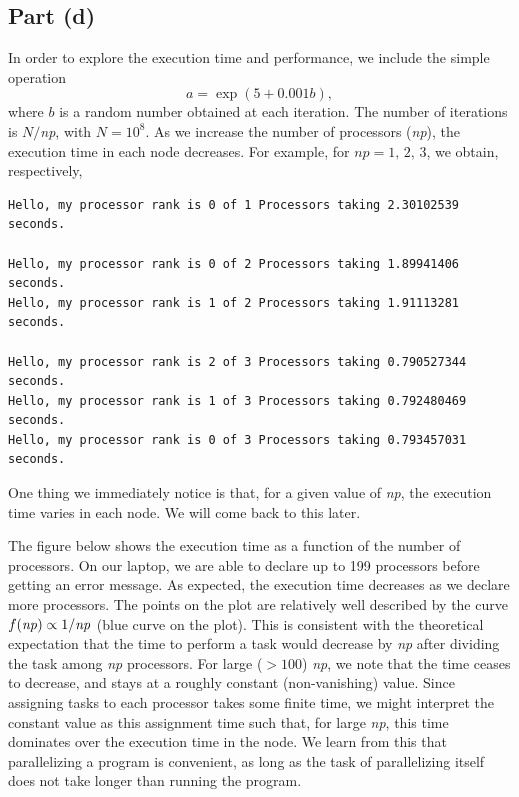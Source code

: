 \documentclass{article}
\begin{document}
\subsection{Part (d)}
In order to explore the execution time and performance, we include the simple operation
\begin{equation}
a = \exp(5+0.001 b),
\end{equation}
where $b$ is a random number obtained at each iteration. The number of iterations is $N/$\textit{np},
with $N=10^8$. As we increase the number of processors (\textit{np}), 
the execution time in each node decreases. For example, for $np = 1, \,2,\,3$, we obtain, respectively,
\begin{verbatim}
Hello, my processor rank is 0 of 1 Processors taking 2.30102539 seconds.
 
Hello, my processor rank is 0 of 2 Processors taking 1.89941406 seconds.
Hello, my processor rank is 1 of 2 Processors taking 1.91113281 seconds.
 
Hello, my processor rank is 2 of 3 Processors taking 0.790527344 seconds.
Hello, my processor rank is 1 of 3 Processors taking 0.792480469 seconds.
Hello, my processor rank is 0 of 3 Processors taking 0.793457031 seconds.
\end{verbatim}
One thing we immediately notice is that, for a given value of \textit{np}, the execution time
varies in each node. We will come back to this later. 

The figure below shows the execution time as a function of the number of processors. On our laptop, we are able to declare up
to 199 processors before getting an error message. As expected, the execution time decreases as we declare more processors. 
The points on the plot are relatively well described by the curve $f(\text{\textit{np}}) \propto 1/\text{\textit{np}}$ 
(blue curve on the plot). This is consistent with the theoretical expectation that the time to perform a task would decrease
by \textit{np} after dividing the task among \textit{np} processors. For large ($> 100$) \textit{np}, we note that the time
ceases to decrease, and stays at a roughly constant (non-vanishing) value. Since assigning tasks to each processor takes 
some finite time, we might interpret the constant value as this assignment time such that, for large \textit{np}, this 
time dominates over the execution time in the node. We learn from this that parallelizing a program is convenient, 
as long as the task of parallelizing itself does not take longer than running the program.
\end{document}
